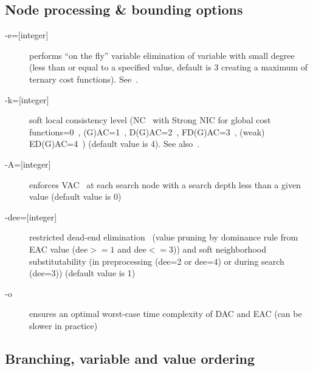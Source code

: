 \documentclass{article}
\begin{document}
\subsection{Node processing \& bounding options}

\begin{description}
\item[{-e=[integer]}] performs ``on the fly'' variable elimination of variable with small
  degree (less than or equal to a specified value, default is 3 creating a
  maximum of ternary cost functions). See~\cite{Larrosa00}.
\item[{-k=[integer]}] soft local consistency level (NC~\cite{Larrosa2002} with Strong NIC for global cost functions=0~\cite{LL2009}, (G)AC=1~\cite{Schiex00b,Larrosa2002}, D(G)AC=2~\cite{CooperFCSP}, FD(G)AC=3~\cite{Larrosa2003}, (weak) ED(G)AC=4~\cite{Heras05,LL2010}) (default value is 4). See also~\cite{Cooper10a,LL2012asa}.
\item[{-A=[integer]}] enforces VAC~\cite{Cooper08} at each search node with a search depth less than a given value (default value is 0)
\item[{-dee=[integer]}] restricted dead-end elimination~\cite{Givry13a} (value pruning by dominance rule from EAC value (dee$>=1$ and dee$<=3$)) and soft neighborhood substitutability (in preprocessing (dee=2 or dee=4) or during search (dee=3)) (default value is 1)
\item[{-o}] ensures an optimal worst-case time complexity of DAC and EAC (can be slower in practice)
\end{description}

\subsection{Branching, variable and value ordering}
\end{document}
